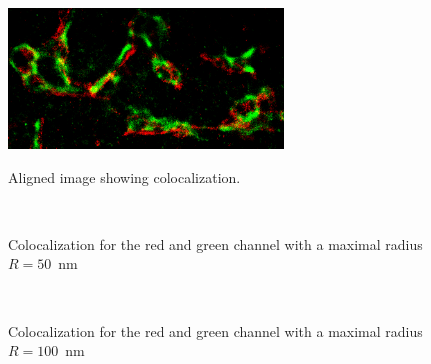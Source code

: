 \begin{figure}
\begin{minipage}[t]{0.99\textwidth}
\centering
	\includegraphics[width = 0.65\textwidth]{pictures/colocalization/cropedOrig.png}
	\caption{Aligned image showing colocalization.}
	\label{cropedOrig}	
\end{minipage}\\
\begin{minipage}[t]{0.99\textwidth}
\hfill
{}
	\caption{Colocalization for the red and green channel with a maximal radius $R=50$~nm}
	\label{radius50}	
\end{minipage}\\
\begin{minipage}[t]{0.99\textwidth}
\hfill
{}
	\caption{Colocalization for the red and green channel with a maximal radius $R=100$~nm}
	\label{radius100}	
\end{minipage}
\end{figure}